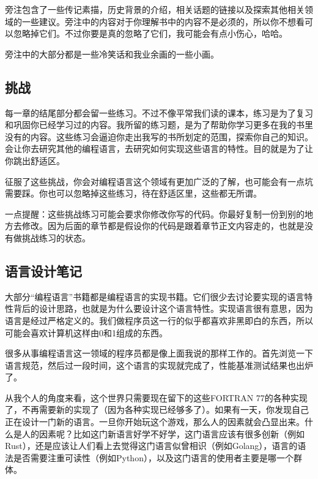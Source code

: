 \documentclass[cn,10pt,math=newtx,citestyle=gb7714-2015,bibstyle=gb7714-2015]{elegantbook}
\begin{document}
旁注包含了一些传记素描，历史背景的介绍，相关话题的链接以及探索其他相关领域的一些建议。旁注中的内容对于你理解书中的内容不是必须的，所以你不想看可以忽略掉它们。不过你要是真的忽略了它们，我可能会有点小伤心，哈哈。

\begin{tcolorbox}
旁注中的大部分都是一些冷笑话和我业余画的一些小画。
\end{tcolorbox}

\subsection{挑战}

每一章的结尾部分都会留一些练习。不过不像平常我们读的课本，练习是为了复习和巩固你已经学习过的内容。我所留的练习题，是为了帮助你学习更多在我的书里没有的内容。这些练习会逼迫你走出我写的书所划定的范围，探索你自己的知识。会让你去研究其他的编程语言，去研究如何实现这些语言的特性。目的就是为了让你跳出舒适区。

征服了这些挑战，你会对编程语言这个领域有更加广泛的了解，也可能会有一点坑需要踩。你也可以忽略掉这些练习，待在舒适区里，这些都无所谓。

\begin{tcolorbox}
一点提醒：这些挑战练习可能会要求你修改你写的代码。你最好复制一份到别的地方去修改。因为后面的章节都是假设你的代码是跟着章节正文内容走的，也就是没有做挑战练习的状态。   
\end{tcolorbox}

\subsection{语言设计笔记}

大部分“编程语言”书籍都是编程语言的实现书籍。它们很少去讨论要实现的语言特性背后的设计思路，也就是为什么要设计这个语言特性。实现语言很有意思，因为语言是经过严格定义的。我们做程序员这一行的似乎都喜欢非黑即白的东西，所以可能会喜欢计算机这样由0和1组成的东西。

\begin{tcolorbox}
很多从事编程语言这一领域的程序员都是像上面我说的那样工作的。首先浏览一下语言规范，然后过一段时间，这个语言的实现就完成了，性能基准测试结果也出炉了。
\end{tcolorbox}

从我个人的角度来看，这个世界只需要现在留下的这些FORTRAN 77的各种实现了，不再需要新的实现了（因为各种实现已经够多了）。如果有一天，你发现自己正在设计一门新的语言。一旦你开始玩这个游戏，那么人的因素就会凸显出来。什么是人的因素呢？比如这门新语言好学不好学，这门语言应该有很多创新（例如Rust），还是应该让人们看上去觉得这门语言似曾相识（例如Golang），语言的语法是否需要注重可读性（例如Python），以及这门语言的使用者主要是哪一个群体。
\end{document}
